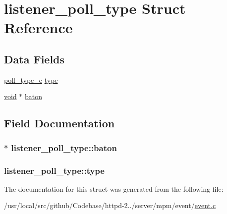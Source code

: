 \hypertarget{structlistener__poll__type}{}\section{listener\+\_\+poll\+\_\+type Struct Reference}
\label{structlistener__poll__type}
\subsection*{Data Fields}
\begin{DoxyCompactItemize}
\item 
\hyperlink{event_8c_a7f24507a3b17f722b93aa92abb3bf974}{poll\+\_\+type\+\_\+e} \hyperlink{structlistener__poll__type_a0c9ee64bd862880b5feb1d103f5e3e4a}{type}
\item 
\hyperlink{group__MOD__ISAPI_gacd6cdbf73df3d9eed42fa493d9b621a6}{void} $\ast$ \hyperlink{structlistener__poll__type_acbefde65f87e6614d7b94ec61aba12ff}{baton}
\end{DoxyCompactItemize}


\subsection{Field Documentation}
\subsubsection[{\texorpdfstring{baton}{baton}}]{$\ast$ listener\+\_\+poll\+\_\+type\+::baton}\hypertarget{structlistener__poll__type_acbefde65f87e6614d7b94ec61aba12ff}{}\label{structlistener__poll__type_acbefde65f87e6614d7b94ec61aba12ff}
\subsubsection[{\texorpdfstring{type}{type}}]{ listener\+\_\+poll\+\_\+type\+::type}\hypertarget{structlistener__poll__type_a0c9ee64bd862880b5feb1d103f5e3e4a}{}\label{structlistener__poll__type_a0c9ee64bd862880b5feb1d103f5e3e4a}


The documentation for this struct was generated from the following file\+:\begin{DoxyCompactItemize}
\item 
/usr/local/src/github/\+Codebase/httpd-\/2../server/mpm/event/\hyperlink{event_8c}{event.\+c}\end{DoxyCompactItemize}
